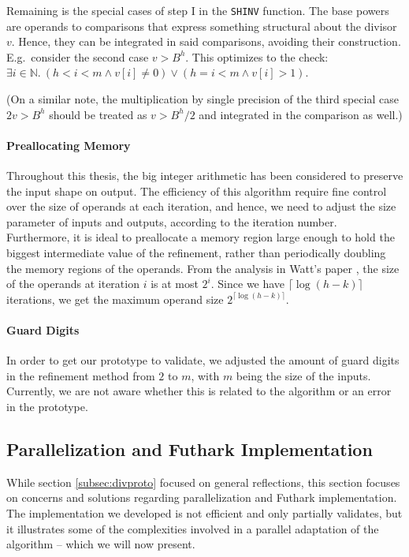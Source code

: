Remaining is the special cases of step I in the \texttt{SHINV} function. The
base powers are operands to comparisons that express something structural about
the divisor $v$. Hence, they can be integrated in said comparisons, avoiding
their construction.  E.g.\ consider the second case $v > B^h$. This optimizes to
the check: $\exists i\in \mathbb{N}.~(h<i<m \land v[i] \neq 0) \lor (h = i<m \land v[i] > 1)$.

(On a similar note, the multiplication by single precision of the third special
case $2v > B^h$ should be treated as $v > B^h/2$ and integrated in the
comparison as well.)

\paragraph{Preallocating Memory}
Throughout this thesis, the big integer arithmetic has been considered to preserve
the input shape on output. The efficiency of this algorithm require fine control
over the size of operands at each iteration, and hence, we need to adjust the
size parameter of inputs and outputs, according to the iteration
number. Furthermore, it is ideal to preallocate a memory region large enough to
hold the biggest intermediate value of the refinement, rather than periodically
doubling the memory regions of the operands. From the analysis in Watt's paper
\cite{watt2023efficient}, the size of the operands at iteration $i$ is at most
$2^i$. Since we have $\lceil \log (h-k) \rceil$ iterations, we get the maximum operand
size $2^{\lceil \log (h-k) \rceil}$.


\paragraph{Guard Digits}
In order to get our prototype to validate, we adjusted the amount of guard
digits in the refinement method from $2$ to $m$, with $m$ being the size of the
inputs. Currently, we are not aware whether this is related to the algorithm or
an error in the prototype.

\subsection{Parallelization and Futhark Implementation}
\label{subsec:divfut}

While section \ref{subsec:divproto} focused on general reflections, this section
focuses on concerns and solutions regarding parallelization and Futhark
implementation. The implementation we developed is not efficient and only
partially validates, but it illustrates some of the complexities involved in a
parallel adaptation of the algorithm -- which we will now present.

